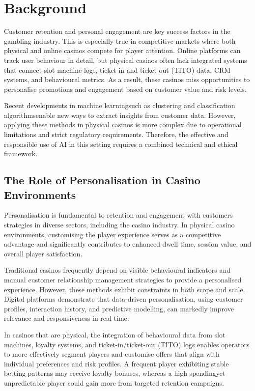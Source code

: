 \documentclass[12pt,a4paper]{report}
\begin{document}
\section{Background}

Customer retention and personal engagement are key success factors in the gambling industry. This is especially true in competitive markets where both physical and online casinos compete for player attention. Online platforms can track user behaviour in detail, but physical casinos often lack integrated systems that connect slot machine logs, ticket-in and ticket-out (TITO) data, CRM systems, and behavioural metrics. As a result, these casinos miss opportunities to personalise promotions and engagement based on customer value and risk levels.

Recent developments in machine learningsuch as clustering and classification algorithmsenable new ways to extract insights from customer data. However, applying these methods in physical casinos is more complex due to operational limitations and strict regulatory requirements. Therefore, the effective and responsible use of AI in this setting requires a combined technical and ethical framework.


\subsection{The Role of Personalisation in Casino Environments}

Personalisation is fundamental to retention and engagement with customers strategies in diverse sectors, including the casino industry.  In physical casino environments, customising the player experience serves as a competitive advantage and significantly contributes to enhanced dwell time, session value, and overall player satisfaction.

 Traditional casinos frequently depend on visible behavioural indicators and manual customer relationship management strategies to provide a personalised experience.  However, these methods exhibit constraints in both scope and scale.  Digital platforms demonstrate that data-driven personalisation, using customer profiles, interaction history, and predictive modelling, can markedly improve relevance and responsiveness in real time.


 In casinos that are physical, the integration of behavioural data from slot machines, loyalty systems, and ticket-in/ticket-out (TITO) logs enables operators to more effectively segment players and customise offers that align with individual preferences and risk profiles.  A frequent player exhibiting stable betting patterns may receive loyalty bonuses, whereas a high spendingyet unpredictable player could gain more from targeted retention campaigns.
\end{document}
